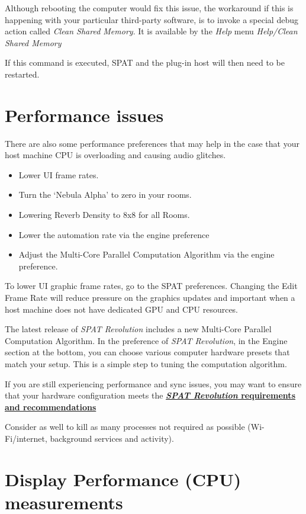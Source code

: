\documentclass[
  letterpaper,
  DIV=11,
  numbers=noendperiod]{scrreport}
\providecommand{\tightlist}{%
  \setlength{\itemsep}{0pt}\setlength{\parskip}{0pt}}\usepackage{longtable,booktabs,array}
\begin{document}
Although rebooting the computer would fix this issue, the workaround if
this is happening with your particular third-party software, is to
invoke a special debug action called \emph{Clean Shared Memory}. It is
available by the \emph{Help} menu \emph{Help/Clean Shared Memory}

If this command is executed, SPAT and the plug-in host will then need to
be restarted.

\hypertarget{performance-issues}{%
\section{Performance issues}\label{performance-issues}}

There are also some performance preferences that may help in the case
that your host machine CPU is overloading and causing audio glitches.

\begin{itemize}
\tightlist
\item
  Lower UI frame rates.
\item
  Turn the `Nebula Alpha' to zero in your rooms.
\item
  Lowering Reverb Density to 8x8 for all Rooms.
\item
  Lower the automation rate via the engine preference
\item
  Adjust the Multi-Core Parallel Computation Algorithm via the engine
  preference.
\end{itemize}

To lower UI graphic frame rates, go to the SPAT preferences. Changing
the Edit Frame Rate will reduce pressure on the graphics updates and
important when a host machine does not have dedicated GPU and CPU
resources.

The latest release of \emph{SPAT Revolution} includes a new Multi-Core
Parallel Computation Algorithm. In the preference of \emph{SPAT
Revolution}, in the Engine section at the bottom, you can choose various
computer hardware presets that match your setup. This is a simple step
to tuning the computation algorithm.

If you are still experiencing performance and sync issues, you may want
to ensure that your hardware configuration meets the
\textbf{\href{Appendix_A.md}{\emph{SPAT Revolution} requirements and
recommendations}}

Consider as well to kill as many processes not required as possible
(Wi-Fi/internet, background services and activity).

\hypertarget{display-performance-cpu-measurements}{%
\section{Display Performance (CPU)
measurements}\label{display-performance-cpu-measurements}}
\end{document}
